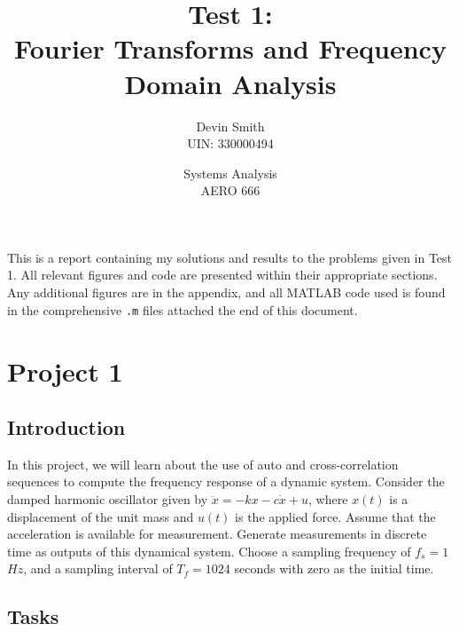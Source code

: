 \documentclass{article}
\title{Test 1:\\Fourier Transforms and Frequency Domain Analysis}
\author{Devin Smith\\UIN: 330000494}
\date{Systems Analysis\\AERO 666}
\begin{document}
\maketitle

This is a report containing my solutions and results to the problems given in Test 1. All relevant figures and code are presented within their appropriate sections. Any additional figures are in the appendix, and all MATLAB code used is found in the comprehensive \texttt{.m} files attached the end of this document. 

\section{Project 1}
\subsection{Introduction}

In this project, we will learn about the use of auto and cross-correlation sequences to compute the frequency response of a dynamic system. Consider the damped harmonic oscillator given by $\ddot{x}=-kx-c\dot{x}+u$, where $x(t)$ is a displacement of the unit mass and $u(t)$ is the applied force. Assume that the acceleration is available for measurement. Generate measurements in discrete time as outputs of this dynamical system. Choose a  sampling frequency of $f_s=1$ $Hz$, and a sampling interval of $T_f=1024$ seconds with zero as the initial time.

\subsection{Tasks}
\end{document}
